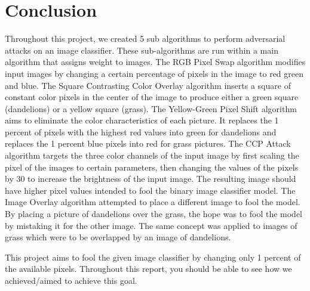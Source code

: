 \documentclass{article}
\begin{document}
\section{Conclusion}
Throughout this project, we created 5 sub algorithms to perform adversarial attacks on an image classifier. These sub-algorithms are run within a main algorithm that assigns weight to images. The RGB Pixel Swap algorithm modifies input images by changing a certain percentage of pixels in the image to red green and blue. The Square Contrasting Color Overlay algorithm inserts a square of constant color pixels in the center of the image to produce either a green square (dandelions) or a yellow square (grass). The Yellow-Green Pixel Shift algorithm aims to eliminate the color characteristics of each picture. It replaces the 1 percent of pixels with the highest red values into green for dandelions and replaces the 1 percent blue pixels into red for grass pictures. The CCP Attack algorithm targets the three color channels of the input image by first scaling the pixel of the images to certain parameters, then changing the values of the pixels by 30 to increase the brightness of the input image. The resulting image should have higher pixel values intended to fool the binary image classifier model. The Image Overlay algorithm attempted to place a different image to fool the model. By placing a picture of dandelions over the grass, the hope was to fool the model by mistaking it for the other image. The same concept was applied to images of grass which were to be overlapped by an image of dandelions.

This project aims to fool the given image classifier by changing only 1 percent of the available pixels. Throughout this report, you should be able to see how we achieved/aimed to achieve this goal. 
\end{document}

